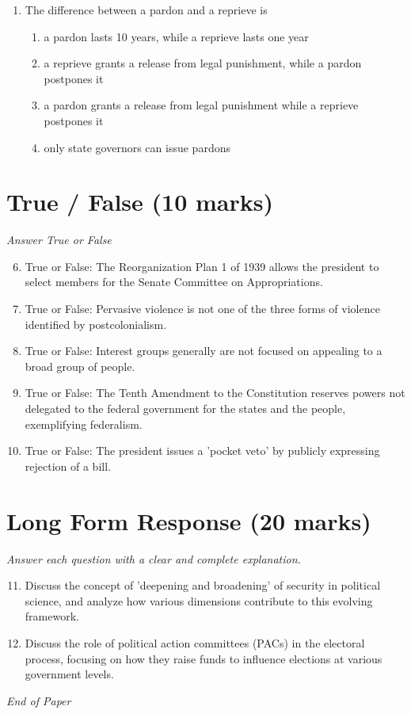 \documentclass[12pt]{article}
\begin{document}
\begin{enumerate}[label=\arabic*.]
\begin{enumerate}[label=(\alph*)]
    \item extend voting rights to racial minorities and women
    \item apply most Bill of Rights protections to state law
    \item hasten the integration of public schools
\end{enumerate}
\item The difference between a pardon and a reprieve is
\begin{enumerate}[label=(\alph*)]
    \item a pardon lasts 10 years, while a reprieve lasts one year
    \item a reprieve grants a release from legal punishment, while a pardon postpones it
    \item a pardon grants a release from legal punishment while a reprieve postpones it
    \item only state governors can issue pardons
\end{enumerate}
\end{enumerate}

\section*{True / False (10 marks)}
\textit{Answer True or False}
\begin{enumerate}[label=\arabic*.]
\setcounter{enumi}{5}
\item True or False: The Reorganization Plan 1 of 1939 allows the president to select members for the Senate Committee on Appropriations.
\item True or False: Pervasive violence is not one of the three forms of violence identified by postcolonialism.
\item True or False: Interest groups generally are not focused on appealing to a broad group of people.
\item True or False: The Tenth Amendment to the Constitution reserves powers not delegated to the federal government for the states and the people, exemplifying federalism.
\item True or False: The president issues a 'pocket veto' by publicly expressing rejection of a bill.
\end{enumerate}

\section*{Long Form Response (20 marks)}
\textit{Answer each question with a clear and complete explanation.}
\begin{enumerate}[label=\arabic*.]
\setcounter{enumi}{10}
\item Discuss the concept of 'deepening and broadening' of security in political science, and analyze how various dimensions contribute to this evolving framework.
\item Discuss the role of political action committees (PACs) in the electoral process, focusing on how they raise funds to influence elections at various government levels.
\end{enumerate}

\vfill
\noindent\textit{End of Paper}
\end{document}
